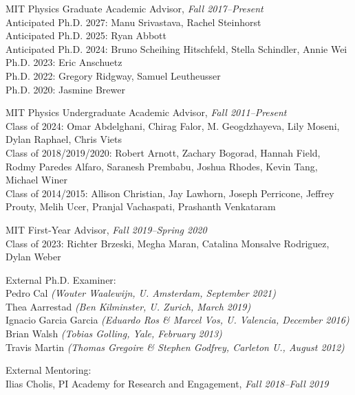 \item MIT Physics Graduate Academic Advisor, \emph{Fall 2017--Present}
\\ \sh Anticipated Ph.D. 2027:  Manu Srivastava, Rachel Steinhorst
\\ \sh Anticipated Ph.D. 2025:  Ryan Abbott
\\ \sh Anticipated Ph.D. 2024:  Bruno Scheihing Hitschfeld, Stella Schindler, Annie Wei
\\ \sh Ph.D. 2023:  Eric Anschuetz
\\ \sh Ph.D. 2022:  Gregory Ridgway, Samuel Leutheusser
\\ \sh Ph.D. 2020:  Jasmine Brewer
\item MIT Physics Undergraduate Academic Advisor, \emph{Fall 2011--Present}
\\ \sh Class of 2024:  Omar Abdelghani, Chirag Falor, M. Geogdzhayeva, Lily Moseni, Dylan Raphael, Chris Viets
\\ \sh Class of 2018/2019/2020:  Robert Arnott, Zachary Bogorad, Hannah Field, Rodmy Paredes Alfaro, Saranesh Prembabu, Joshua Rhodes, Kevin Tang, Michael Winer
\\ \sh Class of 2014/2015:  Allison Christian, Jay Lawhorn, Joseph Perricone, Jeffrey Prouty, Melih Ucer, Pranjal Vachaspati, Prashanth Venkataram
\item MIT First-Year Advisor, \emph{Fall 2019--Spring 2020}
\\ \sh Class of 2023:  Richter Brzeski, Megha Maran, Catalina Monsalve Rodriguez, Dylan Weber

\item External Ph.D. Examiner:
\\ \sh Pedro Cal \textit{(Wouter Waalewijn, U. Amsterdam, September 2021)}
\\ \sh Thea Aarrestad \textit{(Ben Kilminster, U. Zurich, March 2019)}
\\ \sh Ignacio Garcia Garcia \textit{(Eduardo Ros \& Marcel Vos, U. Valencia, December 2016)}
\\ \sh Brian Walsh \textit{(Tobias Golling, Yale, February 2013)}
\\ \sh Travis Martin \textit{(Thomas Gregoire \& Stephen Godfrey, Carleton U., August 2012)}

\item External Mentoring:
\\ \sh Ilias Cholis, PI Academy for Research and Engagement, \emph{Fall 2018--Fall 2019}

\el

